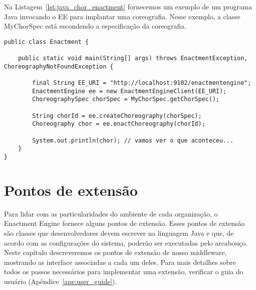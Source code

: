 Na Listagem~\ref{lst:java_chor_enactment} fornecemos um exemplo de 
um programa Java invocando o EE para implantar uma coreografia.
Nesse exemplo, a classe \textsf{MyChorSpec} está escondendo a 
especificação da coreografia.

\begin{lstlisting}[breaklines, caption={Programa Java que invoca o \ee para implantar uma coreografia.}, label={lst:java_chor_enactment}]
public class Enactment {

    public static void main(String[] args) throws EnactmentException, ChoreographyNotFoundException {

        final String EE_URI = "http://localhost:9102/enactmentengine";
        EnactmentEngine ee = new EnactmentEngineClient(EE_URI);
        ChoreographySpec chorSpec = MyChorSpec.getChorSpec();

        String chorId = ee.createChoreography(chorSpec);
        Choreography chor = ee.enactChoreography(chorId);

        System.out.println(chor); // vamos ver o que aconteceu...
    }
}
\end{lstlisting}


\section{Pontos de extensão}
\label{sec:extensao}

Para lidar com as particularidades do ambiente de cada organização, o Enactment Engine fornece alguns pontos de extensão. Esses pontos de extensão são classes que desenvolvedores devem escrever na linguagem Java e que, de acordo com as configurações do sistema, poderão ser executadas pelo arcabouço.
Neste capítulo descreveremos os pontos de extensão de nosso middleware, 
mostrando as interface associadas a cada um deles.
Para mais detalhes sobre todos os passos necessários para implementar
uma extensão, verificar o guia do usuário (Apêndice~\ref{ape:user_guide}).

